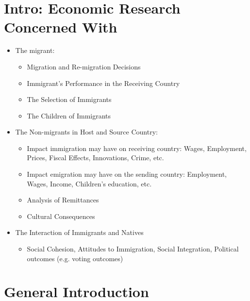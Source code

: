 \section{Intro: Economic Research Concerned With}
\begin{itemize}
    \item The migrant:
    \begin{itemize}
    \item Migration and Re-migration Decisions
    \item Immigrant's Performance in the Receiving Country
    \item The Selection of Immigrants
    \item The Children of Immigrants
    \end{itemize}

    \item The Non-migrants in Host and Source Country:
    \begin{itemize}
    \item Impact immigration may have on receiving country: Wages, Employment, Prices, Fiscal Effects, Innovations, Crime, etc.
    \item Impact emigration may have on the sending country: Employment, Wages, Income, Children's education, etc.
    \item Analysis of Remittances
    \item Cultural Consequences
    \end{itemize}

    \item The Interaction of Immigrants and Natives
    \begin{itemize}
    \item Social Cohesion, Attitudes to Immigration, Social Integration, Political outcomes (e.g. voting outcomes)
    \end{itemize}
\end{itemize}

\section{General Introduction}
